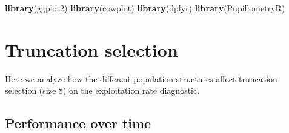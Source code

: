 \documentclass[]{book}
\newenvironment{Shaded}{\begin{snugshade}}{\end{snugshade}}
\newcommand{\KeywordTok}[1]{\textcolor[rgb]{0.13,0.29,0.53}{\textbf{#1}}}
\newcommand{\NormalTok}[1]{#1}
\begin{document}
\begin{Shaded}
\begin{Highlighting}[]
\KeywordTok{library}\NormalTok{(ggplot2)}
\KeywordTok{library}\NormalTok{(cowplot)}
\KeywordTok{library}\NormalTok{(dplyr)}
\KeywordTok{library}\NormalTok{(PupillometryR)}
\end{Highlighting}
\end{Shaded}

\hypertarget{truncation-selection}{%
\section{Truncation selection}\label{truncation-selection}}

Here we analyze how the different population structures affect truncation selection (size 8) on the exploitation rate diagnostic.

\hypertarget{performance-over-time}{%
\subsection{Performance over time}\label{performance-over-time}}
\end{document}
